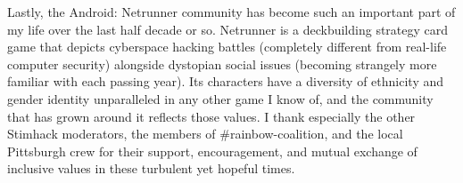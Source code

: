 \documentclass[12pt]{cmuthesis}
\begin{document}
\begin{acknowledgments}
{Lastly,
the Android: Netrunner community has become such an important part of my life
over the last half decade or so.
Netrunner is a deckbuilding strategy card game
that depicts cyberspace hacking battles (completely different from real-life computer security)
alongside dystopian social issues (becoming strangely more familiar with each passing year).
Its characters have a diversity of ethnicity and gender identity %
unparalleled in any other game I know of,
and the community that has grown around it reflects those values.
I thank especially the other Stimhack moderators,
the members of {\sf \#rainbow-coalition},
and the local Pittsburgh crew
for their support, encouragement,
and mutual exchange of inclusive values in these turbulent yet hopeful times.
}

\end{acknowledgments}

\tableofcontents
\listoffigures
\listoftables

\mainmatter


%
%
%
%
%

\newcommand\simics{\textsc{Simics}}
\newcommand{\sect}[1]{\S #1}
\newcommand\hilight[2]{\color{#1}#2\color{black}}
\newcommand\flow[1]{\hilight{brownish}{#1}\xspace}
\newcommand\const[1]{\hilight{brickred}{#1}\xspace}
\newcommand\call[1]{\hilight{pinkish}{#1}}
\newcommand\ctype[1]{\hilight{lime}{#1}\xspace}
\newcommand\ccomment[1]{\hilight{darkcyan}{#1}\xspace}
\end{document}
